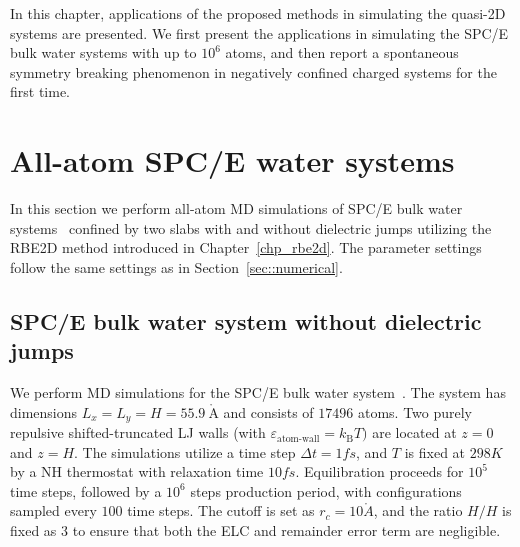 In this chapter, applications of the proposed methods in simulating the quasi-2D systems are presented.
We first present the applications in simulating the SPC/E bulk water systems with up to $10^6$ atoms, and then report a spontaneous symmetry breaking phenomenon in negatively confined charged systems for the first time.

\section{All-atom SPC/E water systems}

In this section we perform all-atom MD simulations of SPC/E bulk water systems~\cite{berendsen1987missing} confined by two slabs with and without dielectric jumps utilizing the RBE2D method introduced in Chapter~\ref{chp_rbe2d}.
The parameter settings follow the same settings as in Section~\ref{sec::numerical}.

\subsection{SPC/E bulk water system without dielectric jumps}
\label{sec::waterhomo}

We perform MD simulations for the SPC/E bulk water system~\cite{berendsen1987missing}. 
The system has dimensions $L_x=L_y=H=55.9~\mathring{\text{A}}$ and consists of $17496$ atoms. 
Two purely repulsive shifted-truncated LJ walls (with $\varepsilon_{\text{atom-wall}}= k_{\text{B}}T)$ are located at $z=0$ and $z=H$.  
The simulations utilize a time step $\Delta t=1fs$, and $T$ is fixed at $298K$ by a NH thermostat with relaxation time $10fs$. 
Equilibration proceeds for $10^5$ time steps, followed by a $10^6$ steps production period, with configurations sampled every $100$ time steps. 
The cutoff is set as $r_c=10\mathring{A}$, and the ratio $H/H$ is fixed as $3$ to ensure that both the ELC and remainder error term are negligible.

